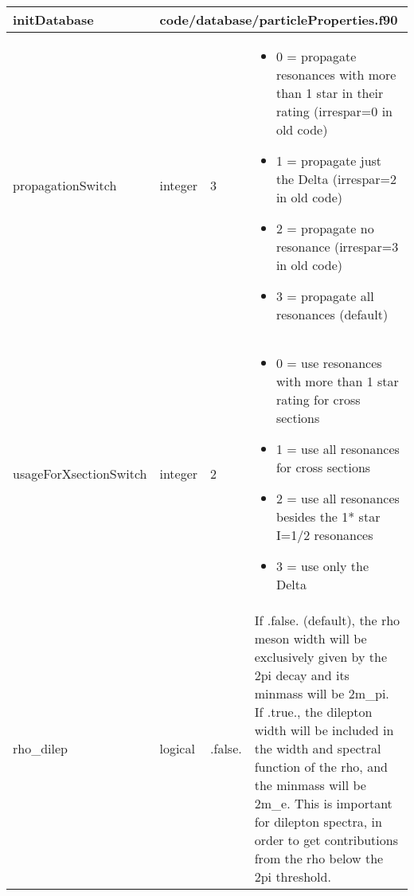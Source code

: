 \documentclass{article}
\begin{document}

\begin{longtable}{llll}
\toprule
\textbf{\large{initDatabase}} & \multicolumn{3}{l}{\footnotesize{code/database/particleProperties.f90}}\\*
\midrule
\endfirsthead
\midrule
\endhead
propagationSwitch & \begin{minipage}[t]{2cm}integer\end{minipage} & \begin{minipage}[t]{2cm}3\end{minipage} & \begin{minipage}[t]{12cm}\begin{itemize}\leftmargin0em\itemindent0pt\item 0 = propagate resonances with more than 1 star in their rating   (irrespar=0 in old code)\item 1 = propagate just the Delta (irrespar=2 in old code)\item 2 = propagate no resonance (irrespar=3 in old code)\item 3 = propagate all resonances (default)\end{itemize}\end{minipage}\\*
\midrule
usageForXsectionSwitch & \begin{minipage}[t]{2cm}integer\end{minipage} & \begin{minipage}[t]{2cm}2\end{minipage} & \begin{minipage}[t]{12cm}\begin{itemize}\leftmargin0em\itemindent0pt\item 0 = use resonances with more than 1 star rating for cross sections\item 1 = use all resonances for cross sections\item 2 = use all resonances besides the 1* star I=1/2 resonances\item 3 = use only the Delta\end{itemize}\end{minipage}\\*
\midrule
rho\_dilep & \begin{minipage}[t]{2cm}logical\end{minipage} & \begin{minipage}[t]{2cm}.false.\end{minipage} & \begin{minipage}[t]{12cm}If .false. (default), the rho meson width will be exclusively given by the 2pi decay and its minmass will be 2m\_pi. If .true., the dilepton width will be included in the width and spectral function of the rho, and the minmass will be 2m\_e. This is important for dilepton spectra, in order to get contributions from the rho below the 2pi threshold.\end{minipage}\\*

\end{longtable}
\end{document}
